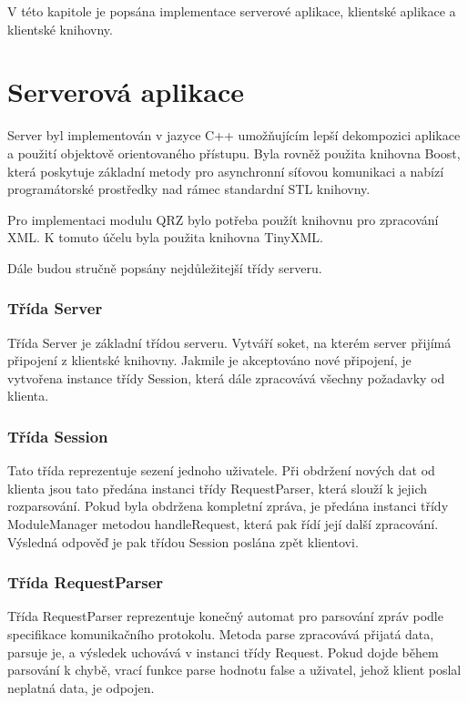 V této kapitole je popsána implementace serverové aplikace, klientské aplikace a klientské knihovny.

\section{Serverová aplikace}
\label{implementace_server}

Server byl implementován v jazyce C++ umožňujícím lepší dekompozici aplikace a
použití objektově orientovaného přístupu. Byla rovněž
použita knihovna Boost, která poskytuje základní metody pro asynchronní síťovou komunikaci a nabízí programátorské prostředky
nad rámec standardní STL knihovny.

Pro implementaci modulu QRZ bylo potřeba použít knihovnu pro zpracování XML. K
tomuto účelu byla použita knihovna TinyXML.

Dále budou stručně popsány nejdůležitejší třídy serveru.

\subsubsection{Třída Server}

Třída Server je základní třídou serveru. Vytváří soket, na kterém server přijímá připojení z klientské knihovny. Jakmile je 
akceptováno nové připojení, je vytvořena instance třídy Session, která dále
zpracovává všechny požadavky od klienta.

\subsubsection{Třída Session}

Tato třída reprezentuje sezení jednoho uživatele. Při obdržení nových dat od klienta jsou tato předána instanci třídy
RequestParser, která slouží k jejich rozparsování. Pokud byla obdržena kompletní zpráva, je předána instanci třídy 
ModuleManager metodou handleRequest, která pak řídí její další zpracování. Výsledná odpověď je pak třídou Session poslána
zpět klientovi.

\subsubsection{Třída RequestParser}

Třída RequestParser reprezentuje konečný automat pro parsování zpráv podle specifikace komunikačního protokolu.
Metoda parse zpracovává přijatá data, parsuje je, a výsledek uchovává v instanci třídy Request. Pokud dojde během parsování
k chybě, vrací funkce parse hodnotu false a uživatel, jehož klient poslal
neplatná data, je odpojen.

